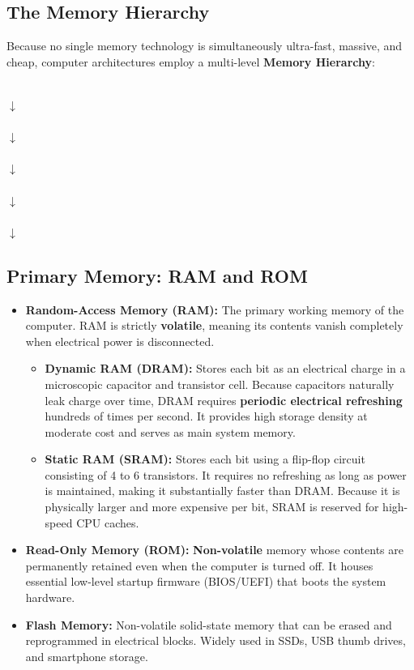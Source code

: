 \subsection{The Memory Hierarchy}
Because no single memory technology is simultaneously ultra-fast, massive, and cheap, computer architectures employ a multi-level \textbf{Memory Hierarchy}:
\begin{center}
 \\
$\downarrow$ \\
 \\
$\downarrow$ \\
 \\
$\downarrow$ \\
 \\
$\downarrow$ \\
 \\
$\downarrow$ \\
\end{center}

\subsection{Primary Memory: RAM and ROM}
\begin{itemize}[leftmargin=1.2em]
    \item \textbf{Random-Access Memory (RAM):} The primary working memory of the computer. RAM is strictly \textbf{volatile}, meaning its contents vanish completely when electrical power is disconnected.
    \begin{itemize}
        \item \textbf{Dynamic RAM (DRAM):} Stores each bit as an electrical charge in a microscopic capacitor and transistor cell. Because capacitors naturally leak charge over time, DRAM requires \textbf{periodic electrical refreshing} hundreds of times per second. It provides high storage density at moderate cost and serves as main system memory.
        \item \textbf{Static RAM (SRAM):} Stores each bit using a flip-flop circuit consisting of 4 to 6 transistors. It requires no refreshing as long as power is maintained, making it substantially faster than DRAM. Because it is physically larger and more expensive per bit, SRAM is reserved for high-speed CPU caches.
    \end{itemize}
    \item \textbf{Read-Only Memory (ROM):} \textbf{Non-volatile} memory whose contents are permanently retained even when the computer is turned off. It houses essential low-level startup firmware (BIOS/UEFI) that boots the system hardware.
    \item \textbf{Flash Memory:} Non-volatile solid-state memory that can be erased and reprogrammed in electrical blocks. Widely used in SSDs, USB thumb drives, and smartphone storage.
\end{itemize}

